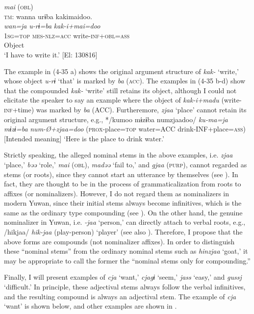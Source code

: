 \ex \textit{mai} (\textsc{obl})\\
\gllll  \textsc{tm}:  wanna  urɨba  kakimaidoo.\\
    \textit{wan=ja}  \textit{u-rɨ=ba}  \textit{kak-i+mai=doo}\\
    1\textsc{sg}=\textsc{top}  \textsc{mes}-\textsc{nlz}=\textsc{acc}  write-\textsc{inf}+\textsc{obl}=\textsc{ass}\\
      Object  \\
    \glt     ‘I have to write it.’ [El: 130816]
    \z
\z

The example in (4-35 a) shows the original argument structure of \textit{kak-} ‘write,’ whose object \textit{u-rɨ} ‘that’ is marked by \textit{ba} (\textsc{acc}). The examples in (4-35 b-d) show that the compounded \textit{kak-} ‘write’ still retains its object, although I could not elicitate the speaker to say an example where the object of \textit{kak-i+madu} (write-\textsc{inf}+time) was marked by \textit{ba} (ACC). Furtheremore, \textit{zjaa} ‘place’ cannot retain its original argument structure, e.g., */kumoo mɨzɨba numzjaadoo/ \textit{ku-ma=ja} \textit{mɨzɨ=ba} \textit{num-Ø+zjaa=doo} (\textsc{prox}-place=\textsc{top} water=ACC drink-INF+place=\textsc{ass}) [Intended meaning] ‘Here is the place to drink water.’

Strictly speaking, the alleged nominal stems in the above examples, i.e. \textit{zjaa} ‘place,’ \textit{bəə} ‘role,’ \textit{mai} (\textsc{obl}), \textit{madəə} ‘fail to,’ and \textit{gjaa} (\textsc{purp}), cannot regarded as stems (or roots), since they cannot start an utterance by themselves (see ). In fact, they are thought to be in the process of grammaticalization from roots to affixes (or nominalizers). However, I do not regard them as nominalizers in modern Yuwan, since their initial stems always become infinitives, which is the same as the ordinary type compounding (see ). On the other hand, the genuine nominalizer in Yuwan, i.e. \textit{{}-jaa} ‘person,’ can directly attach to verbal roots, e.g., /hikjaa/ \textit{hik-jaa} (play-person) ‘player’ (see also ). Therefore, I propose that the above forms are compounds (not nominalizer affixes). In order to distinguish these “nominal stems” from the ordinary nominal stems such as \textit{hinzjaa} ‘goat,’ it may be appropriate to call the former the “nominal stems only for compounding.”

Finally, I will present examples of \textit{cja} ‘want,’ \textit{cjagɨ} ‘seem,’ \textit{jass} ‘easy,’ and \textit{gussj} ‘difficult.’ In principle, these adjectival stems always follow the verbal infinitives, and the resulting compound is always an adjectival stem. The example of \textit{cja} ‘want’ is shown below, and other examples are shown in .

